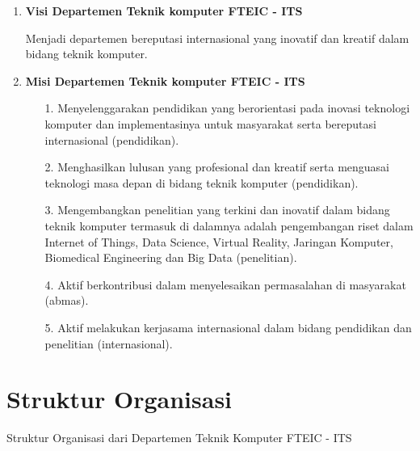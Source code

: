 \begin{enumerate}[nolistsep]

  \item \textbf{Visi Departemen Teknik komputer FTEIC - ITS}

	Menjadi departemen bereputasi internasional yang inovatif dan kreatif dalam bidang teknik komputer.

  \item \textbf{Misi Departemen Teknik komputer FTEIC - ITS}

  \begin{enumerate}[nolistsep]

    \item [1. ] Menyelenggarakan pendidikan yang berorientasi pada inovasi teknologi komputer dan implementasinya untuk masyarakat serta bereputasi internasional (pendidikan).

    \item [2. ] Menghasilkan lulusan yang profesional dan kreatif serta menguasai teknologi masa depan di bidang teknik komputer (pendidikan).

    \item [3. ] Mengembangkan penelitian yang terkini dan inovatif dalam bidang teknik komputer termasuk di dalamnya adalah pengembangan riset dalam Internet of Things, Data Science, Virtual Reality, Jaringan Komputer, Biomedical Engineering dan Big Data (penelitian).

    \item [4. ] Aktif berkontribusi dalam menyelesaikan permasalahan di masyarakat (abmas).

    \item [5. ] Aktif melakukan kerjasama internasional dalam bidang pendidikan dan penelitian (internasional).
  \end{enumerate}

\end{enumerate}

\section{Struktur Organisasi}

Struktur Organisasi dari Departemen Teknik Komputer FTEIC - ITS

